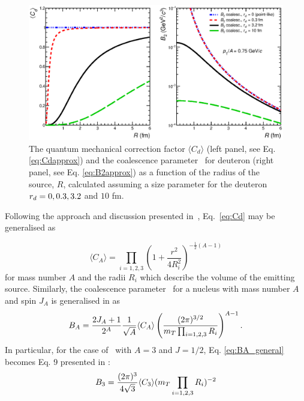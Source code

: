 \documentclass[a4paper,11pt]{scrartcl} %
\begin{document}
\begin{figure}[htbp]
\begin{center}
\includegraphics[width=1.0\textwidth]{theory_coalescence_Cd_B2.eps}
\caption{{The quantum mechanical correction factor $\langle C_{d} \rangle$ (left panel, see Eq. \ref{eq:Cdapprox}) and the coalescence parameter \btwo~for deuteron (right panel, see Eq. \ref{eq:B2approx}) as a function of the radius of the source, $R$, calculated assuming a size parameter for the deuteron $r_{d} = 0, 0.3, 3.2$ and $10$ fm.}}
\label{fig:radiusDependence}
\end{center}
\end{figure}

Following the approach and discussion presented in~\cite{Blum:2017qnn}, Eq.~\ref{eq:Cd} may be generalised as 

\begin{equation}
\langle C_{A} \rangle = \prod_{i=1,2,3} \left(1 + \frac{r^2}{4R_{i}^2} \right)^{-\frac{1}{2}(A-1)}
\label{eq:CA_general}
\end{equation}
%
for mass number $A$ and the radii $R_{i}$ which describe the volume of the emitting source.
Similarly, the coalescence parameter \bA~for a nucleus with mass number $A$ and spin $J_{A}$ is generalised in \cite{Scheibl:1998tk} as
\begin{equation}
B_{A} = \frac{2J_{A} +1}{2^{A}}\frac{1}{\sqrt{A}}  \langle C_{A} \rangle \left( \frac{(2\pi)^{3/2}} {m_{T}\prod_{i=1,2,3} R_{i}} \right)^{A-1}.
\label{eq:BA_general}
\end{equation}
In particular, for the case of \hethree~with $A=3$ and $J=1/2$, Eq. \ref{eq:BA_general} becomes Eq. 9 presented in \cite{Blum:2017qnn}:
\begin{equation}
B_{3} = \frac{(2\pi)^{3}}{4\sqrt{3}} \langle C_{3} \rangle (m_{T}\prod_{i=1,2,3} R_{i})^{-2}
\label{eq:B3}
\end{equation}
 
\end{document}
